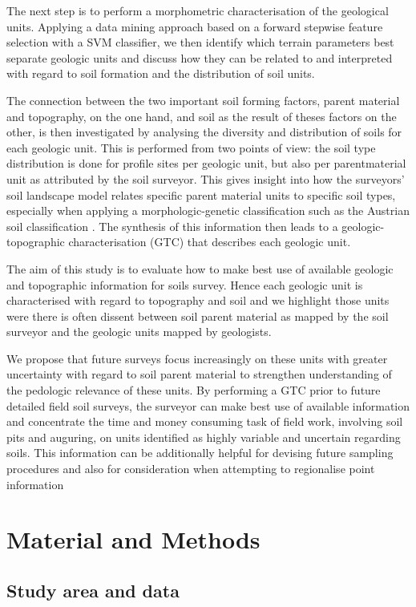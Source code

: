 \documentclass[preprint,12pt,authoryear]{elsarticle}
\begin{document}
The next step is to perform a morphometric characterisation of the geological units. Applying a data mining approach based on a forward stepwise feature selection with a SVM classifier, we then identify which terrain parameters best separate geologic units and discuss how they can be related to and interpreted with regard to soil formation and the distribution of soil units.

The connection between the two important soil forming factors, parent material and topography, on the one hand, and soil as the result of theses factors on the other, is then investigated by analysing the diversity and distribution of soils for each geologic unit. This is performed from two points of view: the soil type distribution is done for profile sites per geologic unit, but also per parentmaterial unit as attributed by the soil surveyor. This gives insight into how the surveyors' soil landscape model relates specific parent material units to specific soil types, especially when applying a morphologic-genetic classification such as the Austrian soil classification \citep{Nestroy2011}. The synthesis of this information then leads to a geologic-topographic characterisation (GTC) that describes each geologic unit. 

The aim of this study is to evaluate how to make best use of available geologic and topographic information for soils survey. Hence each geologic unit is characterised with regard to topography and soil and we highlight those units were there is often dissent between soil parent material as mapped by the soil surveyor and the geologic units mapped by geologists.

 We propose that future surveys focus increasingly on these units with greater uncertainty with regard to soil parent material to strengthen understanding of the pedologic relevance of these units. By performing a GTC prior to future detailed field soil surveys, the surveyor can make best use of available information and concentrate the time and money consuming task of field work, involving soil pits and auguring, on units identified as highly variable and uncertain regarding soils. This information can be additionally helpful for devising future sampling procedures and also for consideration when attempting to regionalise point information


\section{Material and Methods}
\subsection{Study area and data}
\end{document}
